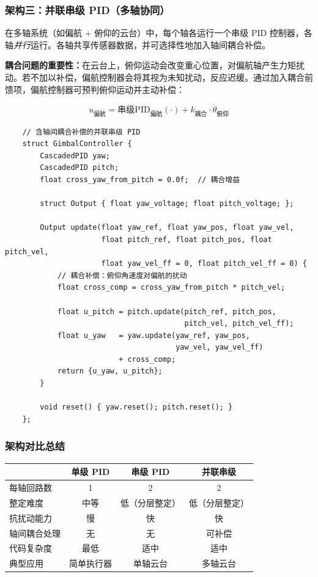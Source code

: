 \subsubsection{架构三：并联串级 PID（多轴协同）}

在多轴系统（如偏航 + 俯仰的云台）中，每个轴各运行一个串级 PID 控制器，各轴\textit{并行}运行。各轴共享传感器数据，并可选择性地加入轴间耦合补偿。

\textbf{耦合问题的重要性：}在云台上，俯仰运动会改变重心位置，对偏航轴产生力矩扰动。若不加以补偿，偏航控制器会将其视为未知扰动，反应迟缓。通过加入耦合前馈项，偏航控制器可预判俯仰运动并主动补偿：

\[
u_{\text{偏航}} = \text{串级PID}_{\text{偏航}}(\cdot) + k_{\text{耦合}} \cdot \dot{\theta}_{\text{俯仰}}
\]

\begin{verbatim}
    // 含轴间耦合补偿的并联串级 PID
    struct GimbalController {
        CascadedPID yaw;
        CascadedPID pitch;
        float cross_yaw_from_pitch = 0.0f;  // 耦合增益

        struct Output { float yaw_voltage; float pitch_voltage; };

        Output update(float yaw_ref, float yaw_pos, float yaw_vel,
                      float pitch_ref, float pitch_pos, float pitch_vel,
                      float yaw_vel_ff = 0, float pitch_vel_ff = 0) {
            // 耦合补偿：俯仰角速度对偏航的扰动
            float cross_comp = cross_yaw_from_pitch * pitch_vel;

            float u_pitch = pitch.update(pitch_ref, pitch_pos,
                                         pitch_vel, pitch_vel_ff);
            float u_yaw   = yaw.update(yaw_ref, yaw_pos,
                                       yaw_vel, yaw_vel_ff)
                          + cross_comp;
            return {u_yaw, u_pitch};
        }

        void reset() { yaw.reset(); pitch.reset(); }
    };
\end{verbatim}

\subsubsection{架构对比总结}

\begin{center}
\begin{tabular}{lccc}
\toprule
 & \textbf{单级 PID} & \textbf{串级 PID} & \textbf{并联串级} \\
\midrule
每轴回路数 & 1 & 2 & 2 \\
整定难度 & 中等 & 低（分层整定） & 低（分层整定） \\
抗扰动能力 & 慢 & 快 & 快 \\
轴间耦合处理 & 无 & 无 & 可补偿 \\
代码复杂度 & 最低 & 适中 & 适中 \\
典型应用 & 简单执行器 & 单轴云台 & 多轴云台 \\
\bottomrule
\end{tabular}
\end{center}

